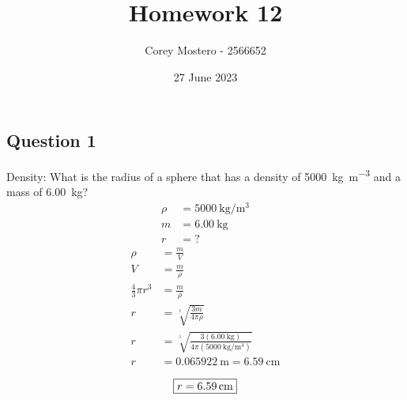 \documentclass{article}
\title{Homework 12}
\date{27 June 2023}
\author{Corey Mostero - 2566652}
\begin{document}
\newcommand{\hr}{\par\noindent\rule{\textwidth}{0.4pt}}

\newcommand{\bc}[1]{
	\begin{equation*}
		\begin{boxed}
			{#1}
		\end{boxed}
	\end{equation*}
}

\newcommand{\cond}[2]{
	\ifmmode
		{#1} \quad {#2}
	\else
		$$ {#1} \quad {#2} $$
	\fi
}

\newcommand{\matr}[1]{
	\ifmmode \bm{#1}
	\else \textit{\textbf{#1}}
	\fi
}
\newcommand{\vect}[1]{
	\ifmmode \mathbf{#1}
	\else \textbf{#1}
	\fi
}


\maketitle
\newpage

\tableofcontents

\subsection{Question 1}

Density: What is the radius of a sphere that has a density of \SI{5000}{\kilogram \per \meter \cubed} and a mass of \SI{6.00}{\kilogram}?
\begin{align*}
	\rho & = \SI{5000}{\kilogram \per \meter \cubed} \\
	m & = \SI{6.00}{\kilogram} \\
	r & = ?
\end{align*}
\begin{align*}
	\rho & = \frac{ m }{ V } \\
	V & = \frac{ m }{ \rho } \\
	\frac{4}{3}\pi r^3 & = \frac{ m }{ \rho } \\
	r & = \sqrt[^3]{ \frac{ 3m }{ 4\pi \rho } } \\
	r & = \sqrt[^3]{ \frac{ 3(\SI{6.00}{\kilogram}) }{ 4\pi (\SI{5000}{\kilogram \per \meter \cubed}) } } \\
	r & = \SI{0.065922}{\meter} = \SI{6.59}{\centi \meter}
\end{align*}
\bc{ r = \SI{6.59}{\centi \meter} }
\end{document}
